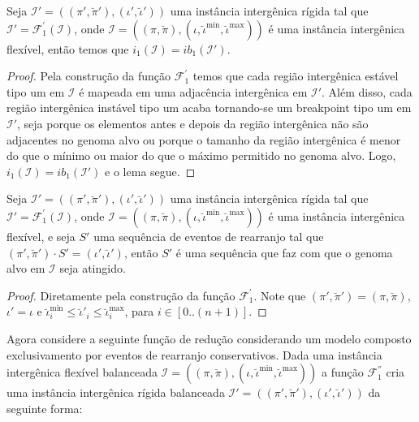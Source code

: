 \begin{lemma}\label{lemma:UFTVNRSX}
Seja $\mathcal{I'} = ((\pi',\breve\pi'),(\iota',\breve\iota'))$ uma instância intergênica rígida tal que $\mathcal{I'} = \mathcal{F}_{1}^{'}(\mathcal{I})$, onde $\mathcal{I} = ((\pi,\breve\pi),(\iota,\breve\iota^{\min},\breve\iota^{\max}))$ é uma instância intergênica flexível, então temos que $i_1(\mathcal{I}) = ib_1(\mathcal{I'})$.
\end{lemma}
\begin{proof}
Pela construção da função $\mathcal{F}_{1}^{'}$ temos que cada região intergênica estável tipo um em $\mathcal{I}$ é mapeada em uma adjacência intergênica em $\mathcal{I'}$. Além disso, cada região intergênica instável tipo um acaba tornando-se um breakpoint tipo um em $\mathcal{I'}$, seja porque os elementos antes e depois da região intergênica não são adjacentes no genoma alvo ou porque o tamanho da região intergênica é menor do que o mínimo ou maior do que o máximo permitido no genoma alvo. Logo, $i_1(\mathcal{I}) = ib_1(\mathcal{I'})$ e o lema segue.
\end{proof}

\begin{lemma}\label{lemma:SVKOAOXA}
Seja $\mathcal{I'} = ((\pi',\breve\pi'),(\iota',\breve\iota'))$ uma instância intergênica rígida tal que $\mathcal{I'} = \mathcal{F}_{1}^{'}(\mathcal{I})$, onde $\mathcal{I} = ((\pi,\breve\pi),(\iota,\breve\iota^{\min},\breve\iota^{\max}))$ é uma instância intergênica flexível, e seja $S'$ uma sequência de eventos de rearranjo tal que $(\pi',\breve\pi') \cdot S' = (\iota',\breve\iota')$, então $S'$ é uma sequência que faz com que o genoma alvo em $\mathcal{I}$ seja atingido.
\end{lemma}
\begin{proof}
Diretamente pela construção da função $\mathcal{F}_{1}^{'}$. Note que $(\pi',\breve\pi') = (\pi,\breve\pi)$, $\iota' = \iota$ e $\breve\iota^{\min}_i \le \breve\iota'_i \le \breve\iota^{\max}_i$, para $i \in [0..({n+1})]$.
\end{proof}

Agora considere a seguinte função de redução considerando um modelo composto exclusivamento por eventos de rearranjo conservativos. Dada uma instância intergênica flexível balanceada $\mathcal{I} = ((\pi,\breve\pi),(\iota,\breve\iota^{\min},\breve\iota^{\max}))$ a função $\mathcal{F}_{1}^{''}$ cria uma instância intergênica rígida balanceada $\mathcal{I'} = ((\pi',\breve\pi'),(\iota',\breve\iota'))$ da seguinte forma:

